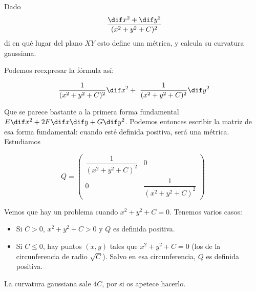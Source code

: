 \begin{problem}[2] Dado \[ \frac{\dif x^2 + \dif y^2}{(x^2+y^2+C)^2} \] di en qué lugar del plano $XY$ esto define una métrica, y calcula su curvatura gaussiana.

\solution

Podemos reexpresar la fórmula así:

\[ \frac{1}{(x^2+y^2+C)^2}  \dif x^2 +  \frac{1}{(x^2+y^2+C)^2} \dif y^2\]

Que se parece bastante a la primera forma fundamental $E \dif x^2 + 2F \dif x \dif y + G \dif y^2$. Podemos entonces escribir la matriz de esa forma fundamental: cuando esté definida positiva, será una métrica. Estudiamos

\[Q =  \begin{pmatrix}
 \dfrac{1}{(x^2+y^2+C)^2}  & 0 \\
0 & \dfrac{1}{(x^2+y^2+C)^2} 
\end{pmatrix} \]

Vemos que hay un problema cuando $x^2+y^2+C = 0$. Tenemos varios casos:

\begin{itemize}
\item Si $C > 0$, $x^2+y^2 + C > 0$ y $Q$ es definida positiva.
\item Si $C ≤ 0$, hay puntos $(x,y)$ tales que $x^2 + y^2 + C = 0$ (los de la circunferencia de radio $\sqrt{C}$). Salvo en esa circunferencia, $Q$ es definida positiva.
\end{itemize}

La curvatura gaussiana sale $4C$, por si os apetece hacerlo.

\end{problem}

